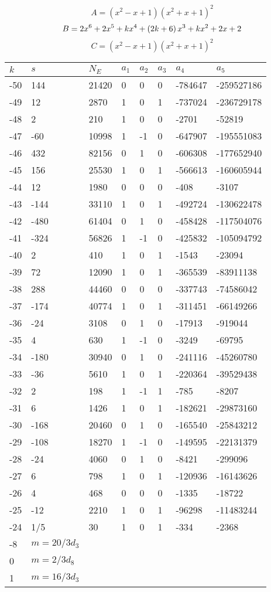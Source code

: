 \documentclass{amsart}
\begin{document}
$$A=(x^2
 - x
 + 1)(x^2
 + x
 + 1)^{2}$$
$$B=2\*x^6
 + 2\*x^5
 + k\*x^4
 + \left(2\*k
 + 6\right) \*x^3
 + k\*x^2
 + 2\*x
 + 2$$
$$C=(x^2
 - x
 + 1)(x^2
 + x
 + 1)^{2}$$
\begin{longtable}{|l|l|l|lllll|}
\hline
$k$ & $s$ & $N_E$ & $a_1$ & $a_2$ & $a_3$ & $a_4$ & $a_5$\\
\hline
-50&144&21420&0&0&0&-784647&-259527186\\
-49&12&2870&1&0&1&-737024&-236729178\\
-48&2&210&1&0&0&-2701&-52819\\
-47&-60&10998&1&-1&0&-647907&-195551083\\
-46&432&82156&0&1&0&-606308&-177652940\\
-45&156&25530&1&0&1&-566613&-160605944\\
-44&12&1980&0&0&0&-408&-3107\\
-43&-144&33110&1&0&1&-492724&-130622478\\
-42&-480&61404&0&1&0&-458428&-117504076\\
-41&-324&56826&1&-1&0&-425832&-105094792\\
-40&2&410&1&0&1&-1543&-23094\\
-39&72&12090&1&0&1&-365539&-83911138\\
-38&288&44460&0&0&0&-337743&-74586042\\
-37&-174&40774&1&0&1&-311451&-66149266\\
-36&-24&3108&0&1&0&-17913&-919044\\
-35&4&630&1&-1&0&-3249&-69795\\
-34&-180&30940&0&1&0&-241116&-45260780\\
-33&-36&5610&1&0&1&-220364&-39529438\\
-32&2&198&1&-1&1&-785&-8207\\
-31&6&1426&1&0&1&-182621&-29873160\\
-30&-168&20460&0&1&0&-165540&-25843212\\
-29&-108&18270&1&-1&0&-149595&-22131379\\
-28&-24&4060&0&1&0&-8421&-299096\\
-27&6&798&1&0&1&-120936&-16143626\\
-26&4&468&0&0&0&-1335&-18722\\
-25&-12&2210&1&0&1&-96298&-11483244\\
-24&1/5&30&1&0&1&-334&-2368\\
-8&$m=20/3d_{3}$&&\multicolumn{5}{c|}{}\\
0&$m=2/3d_{8}$&&\multicolumn{5}{c|}{}\\
1&$m=16/3d_{3}$&&\multicolumn{5}{c|}{}\\
\hline
\end{longtable}
\end{document}

